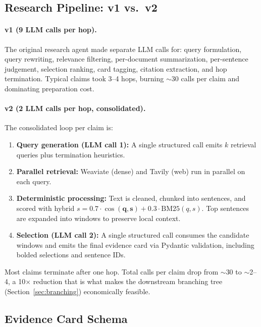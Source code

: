 \subsection{Research Pipeline: v1 vs.\ v2}

\paragraph{v1 (9 LLM calls per hop).}
The original research agent made separate LLM calls for: query
formulation, query rewriting, relevance filtering, per-document
summarization, per-sentence judgement, selection ranking, card tagging,
citation extraction, and hop termination. Typical claims took 3--4 hops,
burning $\sim$30 calls per claim and dominating preparation cost.

\paragraph{v2 (2 LLM calls per hop, consolidated).}
The consolidated loop per claim is:
\begin{enumerate}
    \item \textbf{Query generation (LLM call 1):} A single structured call
    emits $k$ retrieval queries plus termination heuristics.
    \item \textbf{Parallel retrieval:} Weaviate (dense) and Tavily (web)
    run in parallel on each query.
    \item \textbf{Deterministic processing:} Text is cleaned, chunked into
    sentences, and scored with hybrid
    $s = 0.7\cdot \cos(\mathbf{q},\mathbf{s}) + 0.3\cdot\mathrm{BM25}(q,s)$.
    Top sentences are expanded into windows to preserve local context.
    \item \textbf{Selection (LLM call 2):} A single structured call
    consumes the candidate windows and emits the final evidence card via
    Pydantic validation, including bolded selections and sentence IDs.
\end{enumerate}
Most claims terminate after one hop. Total calls per claim drop from
$\sim$30 to $\sim$2--4, a 10$\times$ reduction that is what makes the
downstream branching tree (Section~\ref{sec:branching}) economically
feasible.

\subsection{Evidence Card Schema}

